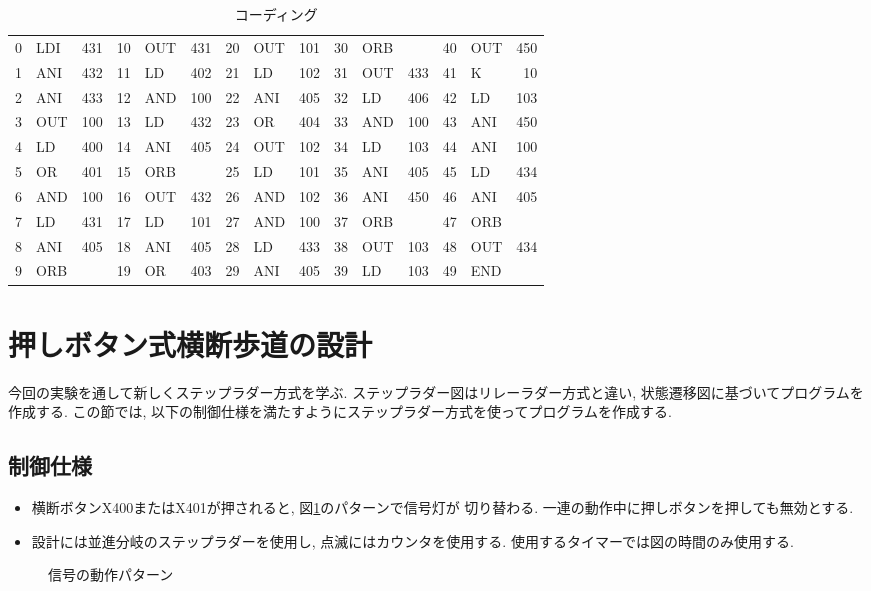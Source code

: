 \documentclass[titlepage]{jsarticle}
\begin{document}
    \begin{table}[h]
      \caption{コーディング}
      \label{tab:quiz_code}
      \centering
      \begin{tabular}{r|lr||r|lr||r|lr||r|lr||r|lr}
        0 & LDI & 431 & 10 & OUT & 431 & 20 & OUT & 101 & 30 & ORB & &     40 & OUT & 450 \\
        1 & ANI & 432 & 11 & LD & 402 &  21 & LD & 102 &  31 & OUT & 433 & 41 & K & 10 \\
        2 & ANI & 433 & 12 & AND & 100 & 22 & ANI & 405 & 32 & LD & 406 &  42 & LD & 103 \\
        3 & OUT & 100 & 13 & LD & 432 &  23 & OR & 404 &  33 & AND & 100 & 43 & ANI & 450 \\
        4 & LD & 400 &  14 & ANI & 405 & 24 & OUT & 102 & 34 & LD & 103 &  44 & ANI & 100 \\
        5 & OR & 401 &  15 & ORB & &     25 & LD & 101 &  35 & ANI & 405 & 45 & LD & 434 \\
        6 & AND & 100 & 16 & OUT & 432 & 26 & AND & 102 & 36 & ANI & 450 & 46 & ANI & 405 \\
        7 & LD & 431 &  17 & LD & 101 &  27 & AND & 100 & 37 & ORB & &     47 & ORB & \\
        8 & ANI & 405 & 18 & ANI & 405 & 28 & LD & 433 &  38 & OUT & 103 & 48 & OUT & 434 \\
        9 & ORB & &     19 & OR & 403 &  29 & ANI & 405 & 39 & LD & 103 &  49 & END & \\
      \end{tabular}
    \end{table}
\section{押しボタン式横断歩道の設計}
  今回の実験を通して新しくステップラダー方式を学ぶ.
  ステップラダー図はリレーラダー方式と違い,
  状態遷移図に基づいてプログラムを作成する.
  この節では, 以下の制御仕様を満たすようにステップラダー方式を使ってプログラムを作成する.
  \subsection{制御仕様}
    \begin{itemize}
      \item 横断ボタンX400またはX401が押されると, 図\ref{fig:sig_pat}のパターンで信号灯が
        切り替わる. 一連の動作中に押しボタンを押しても無効とする.
      \item 設計には並進分岐のステップラダーを使用し, 点滅にはカウンタを使用する.
        使用するタイマーでは図の時間のみ使用する.
    \end{itemize}
    \begin{figure}[h]
      \centering
      \caption{信号の動作パターン}
      \label{fig:sig_pat}
    \end{figure}
\end{document}
